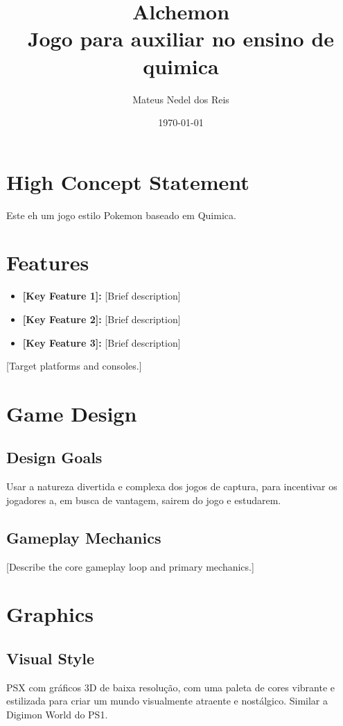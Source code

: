 \documentclass[12pt, a4paper]{article}
\title{\textbf{Alchemon} \\ \Large{Jogo para auxiliar no ensino de quimica}}
\author{Mateus Nedel dos Reis}
\date{\today}
\begin{document}
\maketitle

\section*{High Concept Statement}
Este eh um jogo estilo Pokemon baseado em Quimica.

\section*{Features}
\begin{itemize}
    \item \textbf{[Key Feature 1]:} [Brief description]
    \item \textbf{[Key Feature 2]:} [Brief description]
    \item \textbf{[Key Feature 3]:} [Brief description]
\end{itemize}
[Target platforms and consoles.]

\section*{Game Design}
\subsection*{Design Goals}
Usar a natureza divertida e complexa dos jogos de captura, para incentivar os jogadores a, em busca de vantagem, sairem do jogo e estudarem.

\subsection*{Gameplay Mechanics}
[Describe the core gameplay loop and primary mechanics.]

\section*{Graphics}
\subsection*{Visual Style}
PSX com gráficos 3D de baixa resolução, com uma paleta de cores vibrante e estilizada para criar um mundo visualmente atraente e nostálgico. Similar a Digimon World do PS1.
\end{document}

